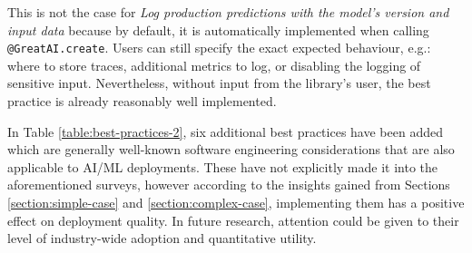 This is not the case for \textit{Log production predictions with the model's version and input data} because by default, it is automatically implemented when calling \texttt{@GreatAI.create}. Users can still specify the exact expected behaviour, e.g.: where to store traces, additional metrics to log, or disabling the logging of sensitive input. Nevertheless, without input from the library's user, the best practice is already reasonably well implemented.

In Table \ref{table:best-practices-2}, six additional best practices have been added which are generally well-known software engineering considerations that are also applicable to AI/ML deployments. These have not explicitly made it into the aforementioned surveys, however according to the insights gained from Sections \ref{section:simple-case} and \ref{section:complex-case}, implementing them has a positive effect on deployment quality. In future research, attention could be given to their level of industry-wide adoption and quantitative utility.

